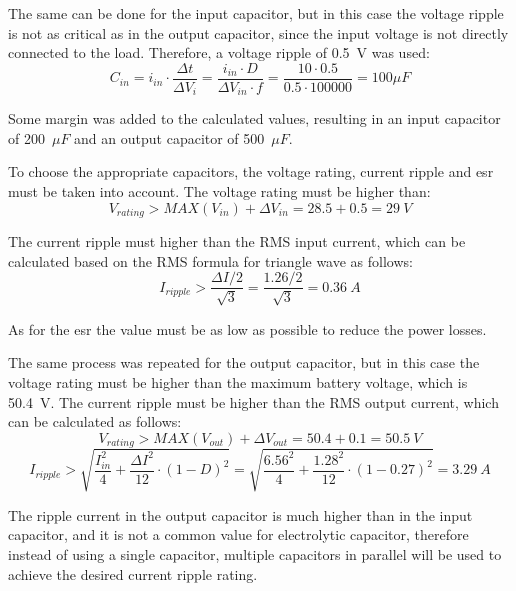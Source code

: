     The same can be done for the input capacitor, but in this case the voltage ripple is not as critical as in the output capacitor, since the input voltage is not directly connected to the load. Therefore, a voltage ripple of 0.5~V was used:
    \begin{equation}
        C_{in} = i_{in} \cdot \frac{\Delta t}{\Delta V_i} = \frac{i_{in} \cdot D}{\Delta V_{in} \cdot f}  =  \frac{10 \cdot 0.5}{0.5 \cdot 100000} = 100 \mu F
    \end{equation}

    Some margin was added to the calculated values, resulting in an input capacitor of 200~$\mu F$ and an output capacitor of 500~$\mu F$.

    To choose the appropriate capacitors, the voltage rating, current ripple and \ac{esr} must be taken into account. The voltage rating must be higher than:
    \begin{equation}
        V_{rating} > MAX(V_{in}) + \Delta V_{in} = 28.5 + 0.5 = 29~V
    \end{equation}

    The current ripple must higher than the RMS input current, which can be calculated based on the RMS formula for triangle wave as follows:
    \begin{equation}
        I_{ripple} > \frac{\Delta I / 2}{\sqrt{3}} = \frac{1.26 / 2}{\sqrt{3}} = 0.36~A
    \end{equation}

    As for the \ac{esr} the value must be as low as possible to reduce the power losses.

    The same process was repeated for the output capacitor, but in this case the voltage rating must be higher than the maximum battery voltage, which is 50.4~V. The current ripple must be higher than the RMS output current, which can be calculated as follows:
    \begin{equation}
        V_{rating} > MAX(V_{out}) + \Delta V_{out} = 50.4 + 0.1 = 50.5~V
    \end{equation}
    \begin{equation}
        I_{ripple} > \sqrt{\frac{I_{in}^2}{4} + \frac{\Delta I ^2}{12} \cdot (1-D)^2} = \sqrt{\frac{6.56^2}{4} + \frac{1.28 ^2}{12} \cdot (1-0.27)^2} = 3.29~A
    \end{equation}

    The ripple current in the output capacitor is much higher than in the input capacitor, and it is not a common value for electrolytic capacitor, therefore instead of using a single capacitor, multiple capacitors in parallel will be used to achieve the desired current ripple rating.

